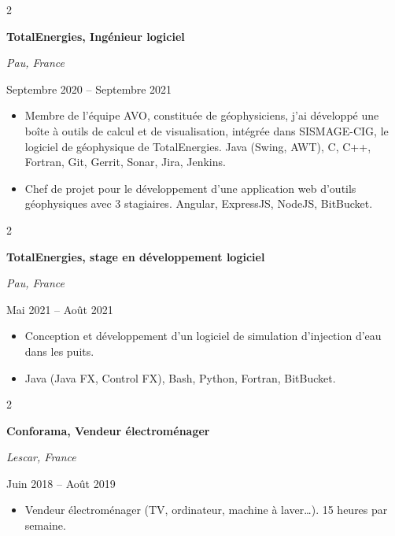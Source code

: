 \documentclass[10pt, letterpaper]{article}
\newenvironment{highlights}{
    \begin{itemize}[
        topsep=0.10 cm,
        parsep=0.10 cm,
        partopsep=0pt,
        itemsep=0pt,
        leftmargin=0.4 cm + 10pt
    ]
}{
    \end{itemize}
} %
\newenvironment{twocolentry}[2][]{
    \onecolentry
    \def\secondColumn{#2}
    \setcolumnwidth{\fill, 6 cm}
    \begin{paracol}{2}
}{
    \switchcolumn \raggedleft \secondColumn
    \end{paracol}
    \endonecolentry
} %
\begin{document}
        \vspace{0.2 cm}

        \begin{twocolentry}{\color{secondaryColor}Septembre 2020 – Septembre 2021}
            \textbf{TotalEnergies, Ingénieur logiciel}

            \textit{Pau, France}
        \end{twocolentry}

        \begin{highlights}
            \item Membre de l’équipe AVO, constituée de géophysiciens, j’ai développé une boîte à outils de calcul et de visualisation, intégrée dans SISMAGE-CIG, le logiciel de géophysique de TotalEnergies.
                \subitem Java (Swing, AWT), C, C++, Fortran, Git, Gerrit, Sonar, Jira, Jenkins.
            \item Chef de projet pour le développement d’une application web d’outils géophysiques avec 3 stagiaires.           \subitem Angular, ExpressJS, NodeJS, BitBucket.
        \end{highlights}
        

        \vspace{0.2 cm}

        \begin{twocolentry}{\color{secondaryColor}Mai 2021 – Août 2021}
            \textbf{TotalEnergies, stage en développement logiciel}

            \textit{Pau, France}
        \end{twocolentry}
        
        \begin{highlights}
            \item Conception et développement d’un logiciel de simulation d’injection d’eau dans les puits.
            \item Java (Java FX, Control FX), Bash, Python, Fortran, BitBucket.
        \end{highlights}
        
        \vspace{0.2 cm}

        \begin{twocolentry}{\color{secondaryColor}Juin 2018 – Août 2019}
            \textbf{Conforama, Vendeur électroménager}

            \textit{Lescar, France}
        \end{twocolentry}

        \begin{highlights}
            \item Vendeur électroménager (TV, ordinateur, machine à laver…). 15 heures par semaine.
        \end{highlights}
\end{document}
